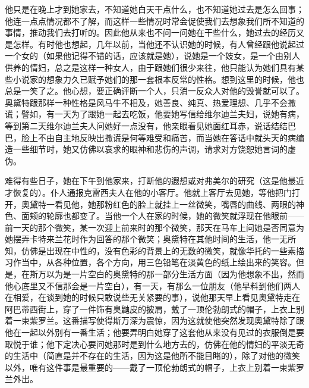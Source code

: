 \par 他只是在晚上才到她家去，不知道她白天干点什么，也不知道她过去是怎么回事；他连一点点情况都不了解，而这样一些情况时常会促使我们去想象我们所不知道的事情，推动我们去打听的。因此他从来也不问一问她在干些什么，她过去的经历又是怎样。有时他也想起，几年以前，当他还不认识她的时候，有人曾经跟他说起过一个女的（如果他记得不错的话，应该就是她），说她是一个妓女，是一个由别人供养的情妇，总之是这样一种女人，由于跟她们很少来往，他只能认为她们具有某些小说家的想象力久已赋予她们的那一套根本反常的性格。想到这里的时候，他也总是一笑了之。他心想，要正确评断一个人，只消一反众人对他的毁誉就可以了。奥黛特跟那样一种性格是风马牛不相及，她善良、纯真、热爱理想、几乎不会撒谎；譬如，有一天为了跟她一起去吃饭，他要她写信给维尔迪兰夫妇，说她有病，等到第二天维尔迪兰夫人问她好一点没有，他亲眼看见她面红耳赤，说话结结巴巴，脸上不由自主地反映出撒谎是何等难受和痛苦，而当她在答话中就头天的病编造一些细节时，她又仿佛以哀求的眼神和悲伤的声调，请求对方饶恕她言词的虚伪。
\par 难得有些日子，她在下午到他家来，打断他的遐想或对弗美尔的研究（这是他最近才恢复的）。仆人通报克雷西夫人在他的小客厅。他就上客厅去见她，等他把门打开，奥黛特一看见他，她那粉红色的脸上就挂上一丝微笑，嘴唇的曲线、两眼的神色、面颊的轮廓也都变了。当他一个人在家的时候，她的微笑就浮现在他眼前——前一天的那个微笑，某一次迎上前来时的那个微笑，那天在马车上问她是否同意为她摆弄卡特来兰花时作为回答的那个微笑；奥黛特在其他时间的生活，他一无所知，仿佛是出现在中性的，没有色彩的背景上的无数的微笑，就像华托的一些素描习作当中，从各种位置，各个方向，用三色铅笔在淡黄色的纸上绘出来的笑容。但是，在斯万以为是一片空白的奥黛特的那一部分生活方面（因为他想象不出，然而他心底里又不信那会是一片空白），有一天，有那么一位朋友（他早料到他们两人在相爱，在谈到她的时候只敢说些无关紧要的事），说他那天早上看见奥黛特走在阿巴蒂西街上，穿了一件饰有臭鼬皮的披肩，戴了一顶伦勃朗式的帽子，上衣上别着一束紫罗兰。这番描写使得斯万深为震惊，因为这就使他突然发现奥黛特除了跟他在一起以外别有一番生活；他要弄明白她穿了这套他从来没有见过的衣服倒是要取悦于谁；他下定决心要问她那时是到什么地方去的，仿佛在他的情妇的平淡无奇的生活中（简直是并不存在的生活，因为这是他所不能目睹的），除了对他的微笑以外，唯有这件事是最重要的——戴了一顶伦勃朗式的帽子，上衣上别着一束紫罗兰外出。
